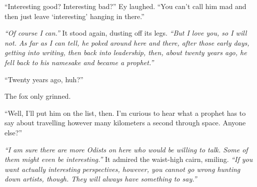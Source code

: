 ``Interesting good? Interesting bad?'' Ey laughed. ``You can't call him mad and then just leave `interesting' hanging in there.''

\emph{``Of course I can.''} It stood again, dusting off its legs. \emph{``But I love you, so I will not. As far as I can tell, he poked around here and there, after those early days, getting into writing, then back into leadership, then, about twenty years ago, he fell back to his namesake and became a prophet.''}

``Twenty years ago, huh?''

The fox only grinned.

``Well, I'll put him on the list, then. I'm curious to hear what a prophet has to say about travelling however many kilometers a second through space. Anyone else?''

\emph{``I am sure there are more Odists on here who would be willing to talk. Some of them might even be interesting.''} It admired the waist-high cairn, smiling. \emph{``If you want actually interesting perspectives, however, you cannot go wrong hunting down artists, though. They will always have something to say.''}
